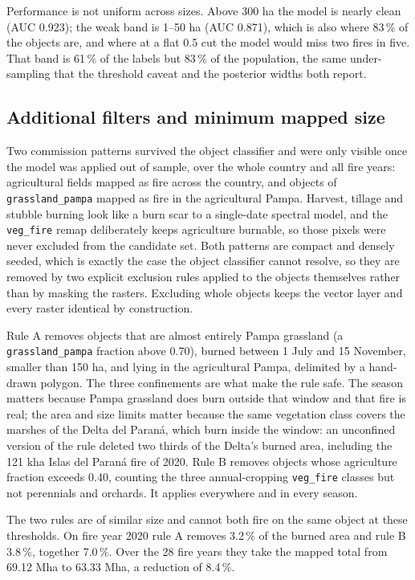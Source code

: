 \documentclass[11pt,a4paper]{article}
\begin{document}
\FloatBarrier

Performance is not uniform across sizes. Above 300 ha the model is nearly clean (AUC 0.923); the
weak band is 1--50 ha (AUC 0.871), which is also where 83\,\% of the objects are, and where at a
flat 0.5 cut the model would miss two fires in five. That band is 61\,\% of the labels but 83\,\%
of the population, the same under-sampling that the threshold caveat and the posterior widths both
report.

\subsection{Additional filters and minimum mapped size}

Two commission patterns survived the object classifier and were only visible once the model was
applied out of sample, over the whole country and all fire years: agricultural fields mapped as
fire across the country, and objects of \texttt{grassland\_pampa} mapped as fire in the
agricultural Pampa. Harvest, tillage and stubble burning look like a burn scar to a single-date
spectral model, and the \texttt{veg\_fire} remap deliberately keeps agriculture burnable, so those
pixels were never excluded from the candidate set. Both patterns are compact and densely seeded,
which is exactly the case the object classifier cannot resolve, so they are removed by two explicit
exclusion rules applied to the objects themselves rather than by masking the rasters. Excluding
whole objects keeps the vector layer and every raster identical by construction.

Rule A removes objects that are almost entirely Pampa grassland (a \texttt{grassland\_pampa}
fraction above 0.70), burned between 1 July and 15 November, smaller than 150 ha, and lying in the
agricultural Pampa, delimited by a hand-drawn polygon. The three confinements are what make the
rule safe. The season matters because Pampa grassland does burn outside that window and that fire
is real; the area and size limits matter because the same vegetation class covers the marshes of
the Delta del Paraná, which burn inside the window: an unconfined version of the rule deleted two
thirds of the Delta's burned area, including the 121 kha Islas del Paraná fire of 2020. Rule B
removes objects whose agriculture fraction exceeds 0.40, counting the three annual-cropping
\texttt{veg\_fire} classes but not perennials and orchards. It applies everywhere and in every
season.

The two rules are of similar size and cannot both fire on the same object at these thresholds. On
fire year 2020 rule A removes 3.2\,\% of the burned area and rule B 3.8\,\%, together 7.0\,\%.
Over the 28 fire years they take the mapped total from 69.12 Mha to 63.33 Mha, a reduction of
8.4\,\%.
\end{document}

